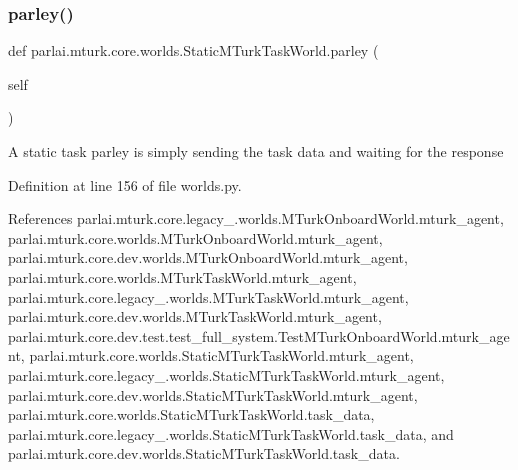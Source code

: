 \subsubsection{\texorpdfstring{parley()}{parley()}}
{\footnotesize\ttfamily def parlai.\+mturk.\+core.\+worlds.\+Static\+M\+Turk\+Task\+World.\+parley (\begin{DoxyParamCaption}\item[{}]{self }\end{DoxyParamCaption})}

\begin{DoxyVerb}A static task parley is simply sending the task data and waiting
for the response
\end{DoxyVerb}
 

Definition at line 156 of file worlds.\+py.



References parlai.\+mturk.\+core.\+legacy\+\_.\+worlds.\+M\+Turk\+Onboard\+World.\+mturk\+\_\+agent, parlai.\+mturk.\+core.\+worlds.\+M\+Turk\+Onboard\+World.\+mturk\+\_\+agent, parlai.\+mturk.\+core.\+dev.\+worlds.\+M\+Turk\+Onboard\+World.\+mturk\+\_\+agent, parlai.\+mturk.\+core.\+worlds.\+M\+Turk\+Task\+World.\+mturk\+\_\+agent, parlai.\+mturk.\+core.\+legacy\+\_.\+worlds.\+M\+Turk\+Task\+World.\+mturk\+\_\+agent, parlai.\+mturk.\+core.\+dev.\+worlds.\+M\+Turk\+Task\+World.\+mturk\+\_\+agent, parlai.\+mturk.\+core.\+dev.\+test.\+test\+\_\+full\+\_\+system.\+Test\+M\+Turk\+Onboard\+World.\+mturk\+\_\+agent, parlai.\+mturk.\+core.\+worlds.\+Static\+M\+Turk\+Task\+World.\+mturk\+\_\+agent, parlai.\+mturk.\+core.\+legacy\+\_.\+worlds.\+Static\+M\+Turk\+Task\+World.\+mturk\+\_\+agent, parlai.\+mturk.\+core.\+dev.\+worlds.\+Static\+M\+Turk\+Task\+World.\+mturk\+\_\+agent, parlai.\+mturk.\+core.\+worlds.\+Static\+M\+Turk\+Task\+World.\+task\+\_\+data, parlai.\+mturk.\+core.\+legacy\+\_.\+worlds.\+Static\+M\+Turk\+Task\+World.\+task\+\_\+data, and parlai.\+mturk.\+core.\+dev.\+worlds.\+Static\+M\+Turk\+Task\+World.\+task\+\_\+data.

\mbox{\label{classparlai_1_1mturk_1_1core_1_1worlds_1_1StaticMTurkTaskWorld_a38d3d55c327426feb97d42c42c5cb49e}} 
